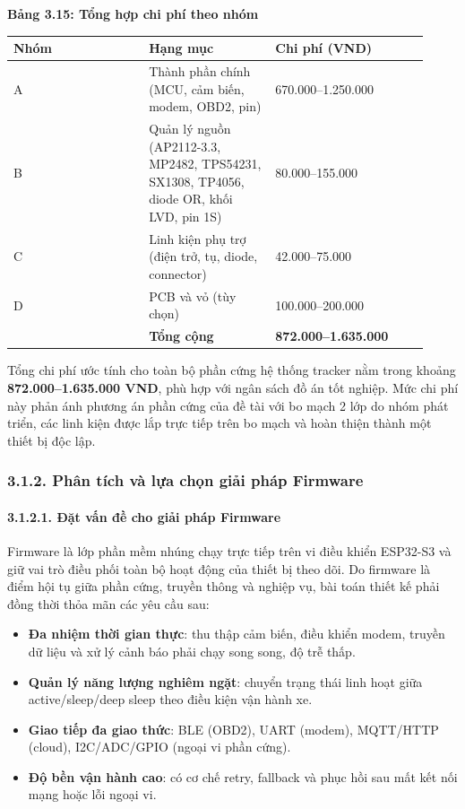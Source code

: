 \documentclass[13pt,a4paper]{extarticle}
\newcounter{none} %
\newcommand{\thesislongtableorignewline}{}
\let\thesislongtableorignewline\\
\renewcommand{\\}{\thesislongtableorignewline\hline}%
\let\\\thesislongtableorignewline
\newcommand{\thesistabletitle}[1]{%
  \begin{center}\textbf{#1}\end{center}%
}
\providecommand{\tightlist}{%
  \setlength{\itemsep}{0pt}\setlength{\parskip}{0pt}}
\begin{document}
\thesistabletitle{Bảng 3.15: Tổng hợp chi phí theo nhóm}

{\def\LTcaptype{none} %
\begin{longtable}{|p{0.30\linewidth}|p{0.28\linewidth}|p{0.34\linewidth}|}
\hline \textbf{Nhóm} & \textbf{Hạng mục} & \textbf{Chi phí (VND)} \\
\hline
\endhead
\hline
\endlastfoot
A & Thành phần chính (MCU, cảm biến, modem, OBD2, pin) &
670.000--1.250.000 \\
B & Quản lý nguồn (AP2112-3.3, MP2482, TPS54231, SX1308, TP4056, diode OR,
khối LVD, pin 1S) & 80.000--155.000 \\
C & Linh kiện phụ trợ (điện trở, tụ, diode, connector) &
42.000--75.000 \\
D & PCB và vỏ (tùy chọn) & 100.000--200.000 \\
& \textbf{Tổng cộng} & \textbf{872.000--1.635.000} \\
\end{longtable}
}

Tổng chi phí ước tính cho toàn bộ phần cứng hệ thống tracker nằm trong
khoảng \textbf{872.000--1.635.000 VND}, phù hợp với ngân sách đồ án tốt
nghiệp. Mức chi phí này phản ánh phương án phần cứng của đề tài với bo
mạch 2 lớp do nhóm phát triển, các linh kiện được lắp trực tiếp trên bo
mạch và hoàn thiện thành một thiết bị độc lập.

\subsubsection{3.1.2. Phân tích và lựa chọn giải pháp Firmware}

\paragraph{3.1.2.1. Đặt vấn đề cho giải pháp
Firmware}\label{3121-ux111ux1eb7t-vux1ea5n-ux111ux1ec1-cho-giux1ea3i-phuxe1p-firmware}

Firmware là lớp phần mềm nhúng chạy trực tiếp trên vi điều khiển
ESP32-S3 và giữ vai trò điều phối toàn bộ hoạt động của thiết bị theo
dõi. Do firmware là điểm hội tụ giữa phần cứng, truyền thông và nghiệp
vụ, bài toán thiết kế phải đồng thời thỏa mãn các yêu cầu sau:

\begin{itemize}
\tightlist
\item
  \textbf{Đa nhiệm thời gian thực}: thu thập cảm biến, điều khiển modem,
  truyền dữ liệu và xử lý cảnh báo phải chạy song song, độ trễ thấp.
\item
  \textbf{Quản lý năng lượng nghiêm ngặt}: chuyển trạng thái linh hoạt
  giữa active/sleep/deep sleep theo điều kiện vận hành xe.
\item
  \textbf{Giao tiếp đa giao thức}: BLE (OBD2), UART (modem), MQTT/HTTP
  (cloud), I2C/ADC/GPIO (ngoại vi phần cứng).
\item
  \textbf{Độ bền vận hành cao}: có cơ chế retry, fallback và phục hồi
  sau mất kết nối mạng hoặc lỗi ngoại vi.
\end{itemize}
\end{document}
